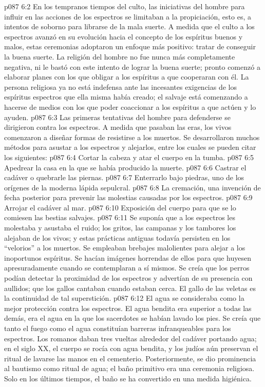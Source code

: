 \vs p087 6:2 En los tempranos tiempos del culto, las iniciativas del hombre para influir en las acciones de los espectros se limitaban a la propiciación, esto es, a intentos de soborno para librarse de la mala suerte. A medida que el culto a los espectros avanzó en su evolución hacia el concepto de los espíritus buenos y malos, estas ceremonias adoptaron un enfoque más positivo: tratar de conseguir la buena suerte. La religión del hombre no fue nunca más completamente negativa, ni le bastó con este intento de lograr la buena suerte; pronto comenzó a elaborar planes con los que obligar a los espíritus a que cooperaran con él. La persona religiosa ya no está indefensa ante las incesantes exigencias de los espíritus espectros que ella misma había creado; el salvaje está comenzando a hacerse de medios con los que poder coaccionar a los espíritus a que actúen y lo ayuden.
\vs p087 6:3 Las primeras tentativas del hombre para defenderse se dirigieron contra los espectros. A medida que pasaban las eras, los vivos comenzaron a diseñar formas de resistirse a los muertos. Se desarrollaron muchos métodos para asustar a los espectros y alejarlos, entre los cuales se pueden citar los siguientes:
\vs p087 6:4 Cortar la cabeza y atar el cuerpo en la tumba.
\vs p087 6:5 Apedrear la casa en la que se había producido la muerte.
\vs p087 6:6 Castrar el cadáver o quebrarle las piernas.
\vs p087 6:7 Enterrarlo bajo piedras, uno de los orígenes de la moderna lápida sepulcral.
\vs p087 6:8 La cremación, una invención de fecha posterior para prevenir las molestias causadas por los espectros.
\vs p087 6:9 Arrojar el cadáver al mar.
\vs p087 6:10 Exposición del cuerpo para que se lo comiesen las bestias salvajes.
\vs p087 6:11 \pc Se suponía que a los espectros les molestaba y asustaba el ruido; los gritos, las campanas y los tambores los alejaban de los vivos; y estas prácticas antiguas todavía persisten en los “velorios” a los muertos. Se empleaban brebajes malolientes para alejar a los inoportunos espíritus. Se hacían imágenes horrendas de ellos para que huyesen apresuradamente cuando se contemplaran a sí mismos. Se creía que los perros podían detectar la proximidad de los espectros y advertían de su presencia con aullidos; que los gallos cantaban cuando estaban cerca. El gallo de las veletas es la continuidad de tal superstición.
\vs p087 6:12 El agua se consideraba como la mejor protección contra los espectros. El agua bendita era superior a todas las demás, era el agua en la que los sacerdotes se habían lavado los pies. Se creía que tanto el fuego como el agua constituían barreras infranqueables para los espectros. Los romanos daban tres vueltas alrededor del cadáver portando agua; en el siglo XX, el cuerpo se rocía con agua bendita, y los judíos aún preservan el ritual de lavarse las manos en el cementerio. Posteriormente, se dio prominencia al bautismo como ritual de agua; el baño primitivo era una ceremonia religiosa. Solo en los últimos tiempos, el baño se ha convertido en una medida higiénica.

